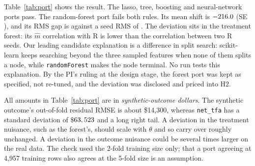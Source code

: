 \documentclass[11pt]{article}
\newcommand{\var}[1]{\texttt{#1}}
\begin{document}
Table~\ref{tab:port} shows the result. The lasso, tree, boosting and neural-network ports
pass. The random-forest port fails both rules. Its mean shift is $-216.0$ (SE
\PortShiftSeForest), and its RMS gap is \PortRmsForest{} against a seed RMS of
\PortRmsSeedForest. The deviation sits in the treatment forest: its $\hat m$ correlation
with R is lower than the correlation between two R seeds. Our leading candidate
explanation is a difference in split search: scikit-learn keeps searching beyond the
three sampled features when none of them splits a node, while \var{randomForest} makes
the node terminal. No run tests this explanation. By the PI's ruling at the design
stage, the forest port was kept as specified, not re-tuned, and the deviation was
disclosed and priced into H2.

All amounts in Table~\ref{tab:port} are in \emph{synthetic-outcome dollars}. The
synthetic outcome's out-of-fold residual RMSE is about \$14,300, whereas \var{net\_tfa}
has a standard deviation of \$$63,523$ and a long right tail. A deviation in the
treatment nuisance, such as the forest's, should scale with $\theta$ and so carry over
roughly unchanged. A deviation in the outcome nuisance could be several times larger on
the real data. The check used the 2-fold training size only; that a port agreeing at
4,957 training rows also agrees at the 5-fold size is an assumption.

\begin{table}[t]
\centering
\caption{Pre-analysis port check: each scikit-learn learner against the authors' R
function, called as in their code. All amounts are in synthetic-outcome dollars (ten
synthetic units on the nine real covariates, true $\theta = 9{,}000$, one 2-fold
partition); they are neither real-data dollars nor tolerances. (a)~Mean Python-minus-R
difference in $\hat\theta$, with its standard error across units. (b)~Smallest
correlation over units between Python and R (seed A) out-of-fold predictions of the
outcome ($\hat\ell$) and treatment ($\hat m$); the R seed B versus seed A value is in
parentheses. (c)~RMS difference between two R seeds, the yardstick; the R lasso is
deterministic. (d)~The forest port fails both the location and the spread rule; the
deviation is in the treatment forest. It is a measured deviation, disclosed and not
re-tuned.}
\label{tab:port}
{\footnotesize\resizebox{\textwidth}{!}{}}
\end{table}

\end{document}
